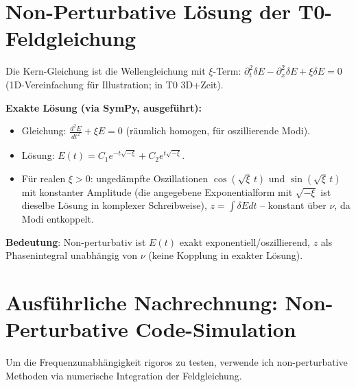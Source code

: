 	\section{Non-Perturbative Lösung der T0-Feldgleichung}
	
	Die Kern-Gleichung ist die Wellengleichung mit $\xi$-Term: $\partial_t^2 \delta E - \partial_x^2 \delta E + \xi \delta E = 0$ (1D-Vereinfachung für Illustration; in T0 3D+Zeit).
	
	\textbf{Exakte Lösung (via SymPy, ausgeführt):}
	\begin{itemize}
		\item Gleichung: $\frac{d^2 E}{dt^2} + \xi E = 0$ (räumlich homogen, für oszillierende Modi).
		\item Lösung: $ E(t) = C_1 e^{-t \sqrt{-\xi}} + C_2 e^{t \sqrt{-\xi}} $.
		\item Für realen $\xi >0$: ungedämpfte Oszillationen $\cos(\sqrt{\xi}\,t)$ und $\sin(\sqrt{\xi}\,t)$ mit konstanter Amplitude (die angegebene Exponentialform mit $\sqrt{-\xi}$ ist dieselbe Lösung in komplexer Schreibweise), $z = \int \delta E  dt$ -- konstant über $\nu$, da Modi entkoppelt.
	\end{itemize}
	
	\textbf{Bedeutung}: Non-perturbativ ist $E(t)$ exakt exponentiell/oszillierend, $z$ als Phasenintegral unabhängig von $\nu$ (keine Kopplung in exakter Lösung).
	
	\section{Ausführliche Nachrechnung: Non-Perturbative Code-Simulation}
	
	Um die Frequenzunabhängigkeit rigoros zu testen, verwende ich non-perturbative Methoden via numerische Integration der Feldgleichung.
	
